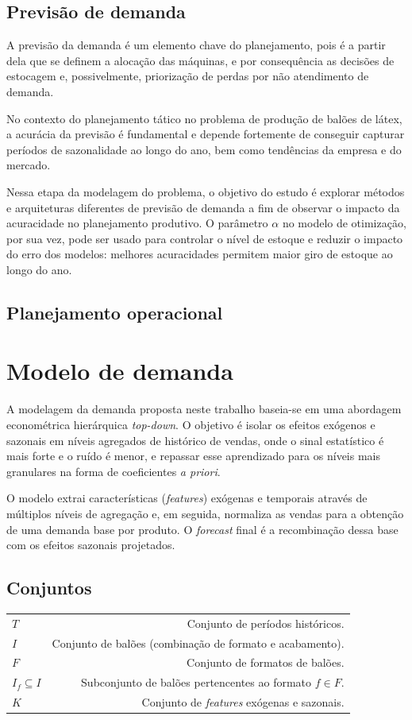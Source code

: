 \documentclass[fleqn,12pt,a4paper]{article}
\begin{document}
\subsection{Previsão de demanda}

A previsão da demanda é um elemento chave do planejamento, pois é a partir dela que se definem a alocação das máquinas, e por consequência as decisões de estocagem e, possivelmente, priorização de perdas por não atendimento de demanda.

No contexto do planejamento tático no problema de produção de balões de látex, a acurácia da previsão é fundamental e depende fortemente de conseguir capturar períodos de sazonalidade ao longo do ano, bem como tendências da empresa e do mercado.

Nessa etapa da modelagem do problema, o objetivo do estudo é explorar métodos e arquiteturas diferentes de previsão de demanda a fim de observar o impacto da acuracidade no planejamento produtivo. O parâmetro $\alpha$ no modelo de otimização, por sua vez, pode ser usado para controlar o nível de estoque e reduzir o impacto do erro dos modelos: melhores acuracidades permitem maior giro de estoque ao longo do ano.


\subsection{Planejamento operacional}

\newpage

\section{Modelo de demanda}

A modelagem da demanda proposta neste trabalho baseia-se em uma abordagem econométrica hierárquica \textit{top-down}. O objetivo é isolar os efeitos exógenos e sazonais em níveis agregados de histórico de vendas, onde o sinal estatístico é mais forte e o ruído é menor, e repassar esse aprendizado para os níveis mais granulares na forma de coeficientes \textit{a priori}. 

O modelo extrai características (\textit{features}) exógenas e temporais através de múltiplos níveis de agregação e, em seguida, normaliza as vendas para a obtenção de uma demanda base por produto. O \textit{forecast} final é a recombinação dessa base com os efeitos sazonais projetados.

\subsection*{Conjuntos}
\begin{tabularx}{\linewidth}{@{}L{2.8cm}R@{}}
$T$ & Conjunto de períodos históricos.\\
$I$ & Conjunto de balões (combinação de formato e acabamento).\\
$F$ & Conjunto de formatos de balões.\\
$I_f \subseteq I$ & Subconjunto de balões pertencentes ao formato $f \in F$.\\
$K$ & Conjunto de \textit{features} exógenas e sazonais.\\
\end{tabularx}
\end{document}
